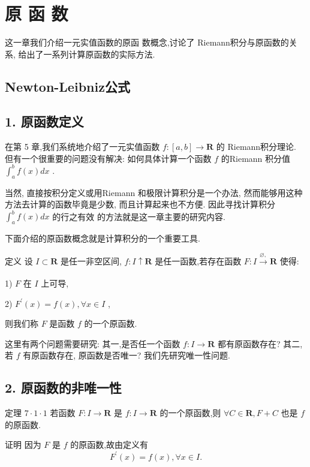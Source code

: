 \chapter{原 函 数}

这一章我们介绍一元实值函数的原函 数概念,讨论了 Riemann积分与原函数的关系, 给出了一系列计算原函数的实际方法.

\section{Newton-Leibniz公式}

\section*{1. 原函数定义}

在第 5 章,我们系统地介绍了一元实值函数 $f : \left\lbrack  {a,b}\right\rbrack   \rightarrow  \mathbf{R}$ 的 Riemann积分理论. 但有一个很重要的问题没有解决: 如何具体计算一个函数 $f$ 的Riemann 积分值 ${\int }_{a}^{b}f\left( x\right) {dx}$ .

当然, 直接按积分定义或用Riemann 和极限计算积分是一个办法, 然而能够用这种方法去计算的函数毕竟是少数, 而且计算起来也不方便. 因此寻找计算积分 ${\int }_{a}^{b}f\left( x\right) {dx}$ 的行之有效 的方法就是这一章主要的研究内容.

下面介绍的原函数概念就是计算积分的一个重要工具.

定义 设 $I \subset  \mathbf{R}$ 是任一非空区间, $f : I \uparrow  \mathbf{R}$ 是任一函数,若存在函数 $F : I\xrightarrow[]{\varnothing ,}\mathbf{R}$ 使得:

1) $F$ 在 $I$ 上可导,

2) ${F}^{\prime }\left( x\right)  = f\left( x\right) ,\forall x \in  I$ ,

则我们称 $F$ 是函数 $f$ 的一个原函数.

这里有两个问题需要研究: 其一,是否任一个函数 $f : I \rightarrow  \mathbf{R}$ 都有原函数存在? 其二, 若 $f$ 有原函数存在, 原函数是否唯一? 我们先研究唯一性问题.

\section*{2. 原函数的非唯一性}

定理 $7 \cdot  1 \cdot  1$ 若函数 $F : I \rightarrow  \mathbf{R}$ 是 $f : I \rightarrow  \mathbf{R}$ 的一个原函数,则 $\forall C \in  \mathbf{R},F + C$ 也是 $f$ 的原函数.

证明 因为 $F$ 是 $f$ 的原函数,故由定义有
$${F}^{\prime }\left( x\right)  = f\left( x\right) ,\forall x \in  I.$$

